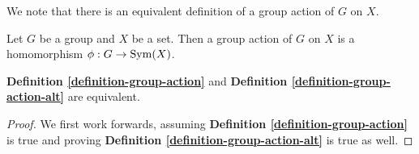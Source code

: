 We note that there is an equivalent definition of a group action of $G$ on $X$.
\begin{definition}\label{definition-group-action-alt}
    Let $G$ be a group and $X$ be a set. Then a group action of $G$ on $X$ is a homomorphism $\phi: G\to \mathrm{Sym}(X)$.
\end{definition}
\begin{theorem}\label{thrm-group-action-definition-equivalence}
    \textbf{Definition \ref{definition-group-action}} and \textbf{Definition \ref{definition-group-action-alt}} are equivalent.
\end{theorem}
\begin{proof}
    We first work forwards, assuming \textbf{Definition \ref{definition-group-action}} is true and proving \textbf{Definition \ref{definition-group-action-alt}} is true as well.
    

\end{proof}
